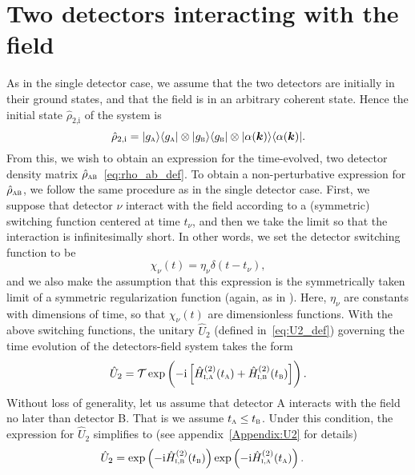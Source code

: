\documentclass[pra,nofootinbib,floats,aps,twocolumn,tightenlines,superscriptaddress]{revtex4-1}
\newcommand{\ket}[1]{| {#1} \rangle}
\newcommand{\bra}[1]{\langle {#1} |}
\newcommand{\ii}{\mathrm{i}}
\newcommand{\rhoab}{\hat{\rho}_\textsc{ab}}
\begin{document}
\section{Two detectors interacting with the field}
\label{sec:two_detectors}

As in the single detector case, we assume that the two detectors are initially in their ground states, and that the field is in an arbitrary coherent state. Hence the initial state $\hat{\rho}_\text{2,i}$ of the system is
\begin{equation}
\label{eq:rho_2i}
    \hat{\rho}_\text{2,i}
    =
    \ket{g_\textsc{a}}\bra{g_\textsc{a}}
    \otimes
    \ket{g_\textsc{b}}\bra{g_\textsc{b}}
    \otimes
    \ket{\alpha(\bm k)}\bra{\alpha(\bm k)}.
\end{equation}
From this, we wish to obtain an expression for the time-evolved, two detector density matrix $\rhoab$~\eqref{eq:rho_ab_def}. To obtain a non-perturbative expression for $\rhoab$, we follow the same procedure as in the single detector case. First, we suppose that detector $\nu$ interact with the field according to a (symmetric) switching function centered at time $t_\nu$, and then we take the limit so that the interaction is infinitesimally short. In other words, we set the detector switching function to be
\begin{equation}
\label{eq:chi_delta_nu}
    \chi_\nu(t)
    =
    \eta_\nu\delta(t-t_\nu),
\end{equation}
and we also make the assumption that this expression is the symmetrically taken limit of a symmetric regularization function (again, as in \cite{Pozas2017}). Here, $\eta_\nu$ are constants with dimensions of time, so that $\chi_\nu(t)$ are dimensionless functions. With the above switching functions, the unitary $\hat{U}_2$ (defined in~\eqref{eq:U2_def}) governing the time evolution of the detectors-field system takes the form
\begin{equation}
    \hat{U}_2
    =
    \mathcal{T}
    \exp
    \left(
    -\ii 
    \left[
    \hat{H}_\textsc{i,a}^{(2)}(t_\textsc{a})
    +\hat{H}_\textsc{i,b}^{(2)}(t_\textsc{b})
    \right]
    \right).
\end{equation}
Without loss of generality, let us assume that detector A interacts with the field no later than detector B. That is we assume $t_\textsc{a}\le t_\textsc{b}$. Under this condition, the expression for $\hat{U}_2$ simplifies to (see appendix~\ref{Appendix:U2} for details)
\begin{align}
\label{eq:U2}
    \hat{U}_2
    &=
    \exp
    \left(-\ii 
    \hat{H}_\textsc{i,b}^{(2)}(t_\textsc{b})
    \right)
    \exp
    \left(-\ii 
    \hat{H}_\textsc{i,a}^{(2)}(t_\textsc{a})
    \right).
\end{align}
\end{document}
